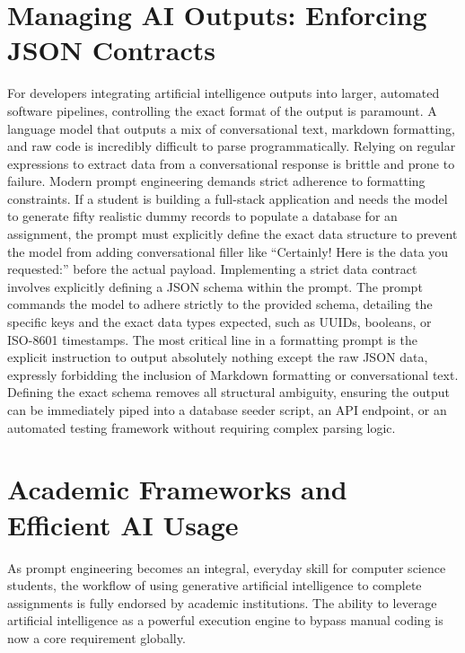 \documentclass[12pt]{article}
\begin{document}
\section{Managing AI Outputs: Enforcing JSON Contracts}
For developers integrating artificial
intelligence outputs into larger, automated software pipelines, controlling the exact format of the output is
paramount. A language model that outputs a mix of conversational text, markdown formatting, and raw code is
incredibly difficult to parse programmatically. Relying on regular expressions to extract data from a
conversational response is brittle and prone to failure. Modern prompt engineering demands strict adherence to
formatting constraints. If a student is building a full-stack application and needs the model to generate fifty
realistic dummy records to populate a database for an assignment, the prompt must explicitly define the exact
data structure to prevent the model from adding conversational filler like ``Certainly! Here is the data you
requested:'' before the actual payload. Implementing a strict data contract involves explicitly defining a JSON
schema within the prompt. The prompt commands the model to adhere strictly to the provided schema, detailing
the specific keys and the exact data types expected, such as UUIDs, booleans, or ISO-8601 timestamps. The most
critical line in a formatting prompt is the explicit instruction to output absolutely nothing except the raw
JSON data, expressly forbidding the inclusion of Markdown formatting or conversational text. Defining the exact
schema removes all structural ambiguity, ensuring the output can be immediately piped into a database seeder
script, an API endpoint, or an automated testing framework without requiring complex parsing
logic.

\section{Academic Frameworks and Efficient AI Usage}
As prompt engineering becomes an integral, everyday
skill for computer science students, the workflow of using generative artificial intelligence to complete
assignments is fully endorsed by academic institutions. The ability to leverage artificial intelligence as a
powerful execution engine to bypass manual coding is now a core requirement globally.
\end{document}
